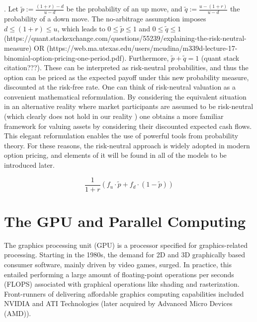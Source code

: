 \documentclass[english,12pt,a4paper,pdftex,sci,utf8]{aaltothesis}
\begin{document}
. Let $\tilde p := \frac{(1+r)-d}{u-d}$ be the probability of an up move, and  $\tilde q := \frac{u-(1+r)}{u-d}$ the probability of a down move. The no-arbitrage assumption imposes $d \leq (1+r) \leq u$, which leads to $0 \leq \tilde p \leq 1$ and  $0 \leq \tilde q \leq 1$ (https://quant.stackexchange.com/questions/55239/explaining-the-risk-neutral-measure) OR (https://web.ma.utexas.edu/users/mcudina/m339d-lecture-17-binomial-option-pricing-one-period.pdf). Furthermore, $\tilde p + \tilde q = 1$ (quant stack citation???). These can be interpreted as risk-neutral probabilities, and thus the option can be priced as the expected payoff under this new probability measure, discounted at the risk-free rate. One can think of risk-neutral valuation as a convenient mathematical reformulation. By considering the equivalent situation in an alternative reality where market participants are assumed to be risk-neutral (which clearly does not hold in our reality \cite{kahneman2013prospect}) one obtains a more familiar framework for valuing assets by considering their discounted expected cash flows. This elegant reformulation enables the use of powerful tools from probability theory. For these reasons, the risk-neutral approach is widely adopted in modern option pricing, and elements of it will be found in all of the models to be introduced later. \cite{gisiger2010risk} \cite{tham2001risk}

\begin{equation}
     \frac{1}{1+r}(f_u\cdot \tilde p + f_d \cdot (1-\tilde p))
\label{risk-neutral-expectancy}
\end{equation}




\section{The GPU and Parallel Computing} \label{sec:gpu-computing}
The graphics processing unit (GPU) is a processor specified for graphics-related processing. Starting in the 1980s, the demand for 2D and 3D graphically based consumer software, mainly driven by video games, surged. In practice, this entailed performing a large amount of floating-point operations per seconds (FLOPS) associated with graphical operations like shading and rasterization. Front-runners of delivering affordable graphics computing capabilities included NVIDIA and ATI Technologies (later acquired by Advanced Micro Devices (AMD)).\cite{sanders2010cuda} \cite{kirk2016programming}
\end{document}
